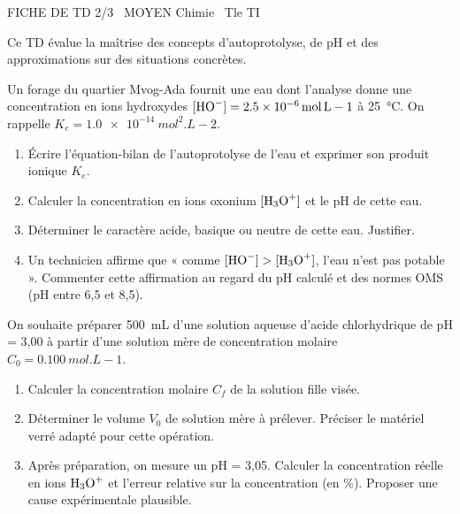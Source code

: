 \documentclass[11pt]{article}
\begin{document}
\begin{tcolorbox}[enhanced,colback=popink,colframe=popink,arc=10pt,boxrule=0pt,left=12pt,right=12pt,top=9pt,bottom=9pt]
{\color{white}\popxbold\small FICHE DE TD 2/3 \textbullet\ MOYEN \hfill Chimie \textbullet\ Tle TI\par}
\end{tcolorbox}
\vspace{4pt}
Ce TD évalue la maîtrise des concepts d'autoprotolyse, de pH et des approximations sur des situations concrètes.

\begin{exercice}
Un forage du quartier Mvog-Ada fournit une eau dont l'analyse donne une concentration en ions hydroxydes $[\ce{HO-}] = \SI{2,5e-6}{mol.L-1}$ à \SI{25}{\celsius}. On rappelle $K_e = \SI{1,0e-14}{mol^2.L-2}$.
\begin{enumerate}
    \item Écrire l'équation-bilan de l'autoprotolyse de l'eau et exprimer son produit ionique $K_e$.
    \item Calculer la concentration en ions oxonium $[\ce{H3O+}]$ et le pH de cette eau.
    \item Déterminer le caractère acide, basique ou neutre de cette eau. Justifier.
    \item Un technicien affirme que « comme $[\ce{HO-}] > [\ce{H3O+}]$, l'eau n'est pas potable ». Commenter cette affirmation au regard du pH calculé et des normes OMS (pH entre 6,5 et 8,5).
\end{enumerate}
\end{exercice}

\begin{exercice}
On souhaite préparer \SI{500}{mL} d'une solution aqueuse d'acide chlorhydrique de pH = 3,00 à partir d'une solution mère de concentration molaire $C_0 = \SI{0,100}{mol.L-1}$.
\begin{enumerate}
    \item Calculer la concentration molaire $C_f$ de la solution fille visée.
    \item Déterminer le volume $V_0$ de solution mère à prélever. Préciser le matériel verré adapté pour cette opération.
    \item Après préparation, on mesure un pH = 3,05. Calculer la concentration réelle en ions $\ce{H3O+}$ et l'erreur relative sur la concentration (en \%). Proposer une cause expérimentale plausible.
\end{enumerate}
\end{exercice}
\end{document}
